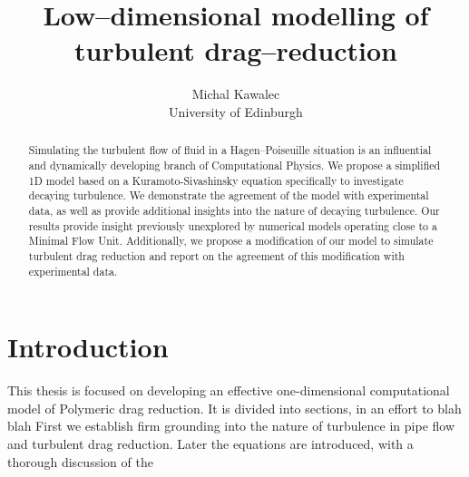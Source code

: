 \documentclass[11pt,a4paper]{article}
\begin{document}
\title{Low--dimensional modelling of turbulent drag--reduction}
\author{Michal Kawalec \\ \small{University of Edinburgh}}
\clearpage\maketitle

\begin{abstract}
Simulating the turbulent flow of fluid in a Hagen–Poiseuille situation is an influential and dynamically developing branch of Computational Physics.
    We propose a simplified 1D model based on a Kuramoto-Sivashinsky equation specifically to investigate decaying turbulence.
    We demonstrate the agreement of the model with experimental data, as well as provide additional insights into the nature of decaying turbulence. Our results provide insight previously unexplored by numerical models operating close to a Minimal Flow Unit.
    Additionally, we propose a modification of our model to simulate turbulent drag reduction and report on the agreement of this modification with experimental data.
\end{abstract}
\thispagestyle{empty}
\newpage
\tableofcontents
\newpage

\section{Introduction}

This thesis is focused on developing an effective one-dimensional computational model of Polymeric drag reduction.
It is divided into sections, in an effort to blah blah
First we establish firm grounding into the nature of turbulence in pipe flow and turbulent drag reduction.
Later the equations are introduced, with a thorough discussion of the 
\end{document}
